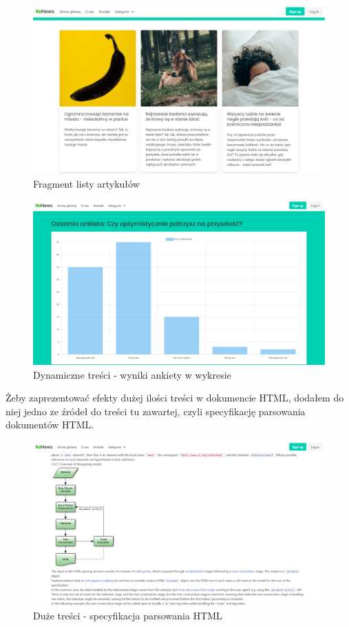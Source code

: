 \documentclass[licencjacka]{pracadypl}
\begin{document}
\begin{figure}[H]
  \includegraphics[width=\linewidth]{images/frontpage-articles.png}
  \caption{Fragment listy artykułów}
  \label{fig:frontpage-articles}
\end{figure}

\begin{figure}[H]
  \includegraphics[width=\linewidth]{images/frontpage-dynamic-article.png}
  \caption{Dynamiczne treści - wyniki ankiety w wykresie}
  \label{fig:frontpage-dynamic}
\end{figure}

Żeby zaprezentować efekty dużej ilości treści w dokumencie HTML, dodałem do niej jedno ze źródeł do treści tu zawartej, czyli specyfikację parsowania dokumentów HTML.

\begin{figure}[H]
  \includegraphics[width=\linewidth]{images/frontpage-spec.png}
  \caption{Duże treści - specyfikacja parsowania HTML}
  \label{fig:frontpage-spec}
\end{figure}
\end{document}
